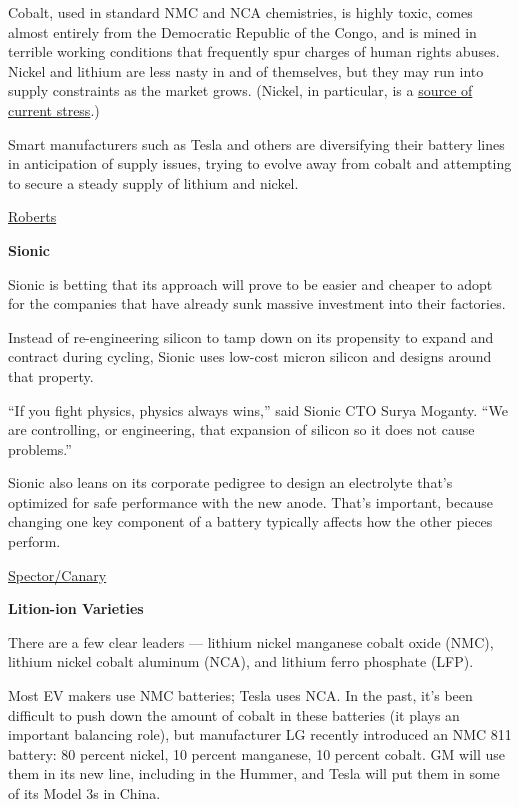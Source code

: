 \documentclass[
]{book}
\begin{document}
Cobalt, used in standard NMC and NCA chemistries, is highly toxic, comes almost entirely from the Democratic Republic of the Congo, and is mined in terrible working conditions that frequently spur charges of human rights abuses. Nickel and lithium are less nasty in and of themselves, but they may run into supply constraints as the market grows. (Nickel, in particular, is a \href{https://www.bbc.com/news/business-56288781}{source of current stress}.)

Smart manufacturers such as Tesla and others are diversifying their battery lines in anticipation of supply issues, trying to evolve away from cobalt and attempting to secure a steady supply of lithium and nickel.

\href{https://www.canarymedia.com/articles/the-basics-of-how-lithium-ion-batteries-work/}{Roberts}

\textbf{Sionic}

Sionic is betting that its approach will prove to be easier and cheaper to adopt for the companies that have already sunk massive investment into their factories.

Instead of re-engineering silicon to tamp down on its propensity to expand and contract during cycling, Sionic uses low-cost micron silicon and designs around that property.

``If you fight physics, physics always wins,'' said Sionic CTO Surya Moganty. ``We are controlling, or engineering, that expansion of silicon so it does not cause problems.''

Sionic also leans on its corporate pedigree to design an electrolyte that's optimized for safe performance with the new anode. That's important, because changing one key component of a battery typically affects how the other pieces perform.

\href{https://www.canarymedia.com/articles/startup-sionic-promises-next-gen-battery-benefits-without-the-wait/}{Spector/Canary}

\textbf{Lition-ion Varieties}

There are a few clear leaders --- lithium nickel manganese cobalt oxide (NMC), lithium nickel cobalt aluminum (NCA), and lithium ferro phosphate (LFP).

Most EV makers use NMC batteries; Tesla uses NCA. In the past, it's been difficult to push down the amount of cobalt in these batteries (it plays an important balancing role), but manufacturer LG recently introduced an NMC 811 battery: 80 percent nickel, 10 percent manganese, 10 percent cobalt. GM will use them in its new line, including in the Hummer, and Tesla will put them in some of its Model 3s in China.
\end{document}
